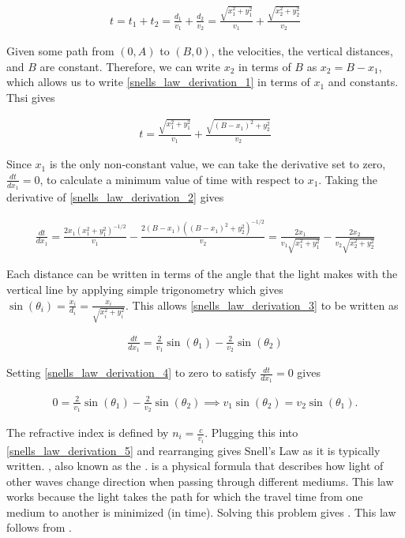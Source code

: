 \begin{align}
t=t_1+t_2 = \frac{d_1}{v_1} + \frac{d_2}{v_2} = \frac{\sqrt{x_1^2+y_1^2}}{v_1} + \frac{\sqrt{x_2^2+y_2^2}}{v_2} \label{snells_law_derivation_1}
\end{align}

Given some path from $(0, A)$ to $(B, 0)$, the velocities, the vertical distances, and $B$ are constant. Therefore, we can write $x_2$ in terms of $B$ as $x_2 = B - x_1$, which allows us to write \ref{snells_law_derivation_1} in terms of $x_1$ and constants. Thsi gives

\begin{align}
t = \frac{\sqrt{x_1^2+y_1^2}}{v_1} + \frac{\sqrt{(B - x_1)^2+y_2^2}}{v_2} \label{snells_law_derivation_2}
\end{align}

Since $x_1$ is the only non-constant value, we can take the derivative set to zero, $\frac{dt}{dx_1}=0$, to calculate a minimum value of time with respect to $x_1$. Taking the derivative of \ref{snells_law_derivation_2} gives

\begin{align}
\frac{dt}{dx_1} = \frac{2x_1(x_1^2+y_1^2)^{-1/2}}{v_1} - \frac{2(B - x_1)((B - x_1)^2+y_2^2)^{-1/2}}{v_2} = \frac{2x_1}{v_1\sqrt{x_1^2+y_1^2}} - \frac{2x_2}{v_2\sqrt{x_2^2+y_2^2}} \label{snells_law_derivation_3}
\end{align}

Each distance can be written in terms of the angle that the light makes with the vertical line by applying simple trigonometry which gives $\sin(\theta_i)=\frac{x_i}{d_i}=\frac{x_i}{\sqrt{x_i^2+y_i^2}}$. This allows \ref{snells_law_derivation_3} to be written as

\begin{align}
\frac{dt}{dx_1} = \frac{2}{v_1}\sin(\theta_1) - \frac{2}{v_2}\sin(\theta_2) \label{snells_law_derivation_4}
\end{align}

Setting \ref{snells_law_derivation_4} to zero to satisfy $\frac{dt}{dx_1}=0$ gives

\begin{align}
0 = \frac{2}{v_1}\sin(\theta_1) - \frac{2}{v_2}\sin(\theta_2) \implies v_1\sin(\theta_2) = v_2\sin(\theta_1) \label{snells_law_derivation_5}.
\end{align}

The refractive index is defined by $n_i = \frac{c}{v_i}$. Plugging this into \ref{snells_law_derivation_5} and rearranging gives Snell's Law as it is typically written. , also known as the . is a physical formula that describes how light of other waves change direction when passing through different mediums. This law works because the light takes the path for which the travel time from one medium to another is minimized (in time). Solving this problem gives . This law follows from .

